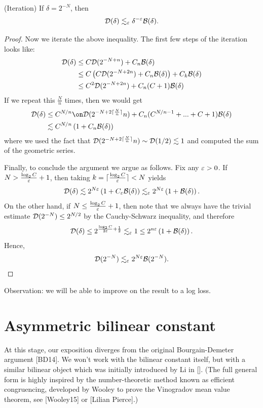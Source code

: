 \begin{cor}(Iteration) If $\delta=2^{-N}$, then
 \begin{align*}
    \mathcal{D}(\delta)\lesssim_\varepsilon \delta^{-\varepsilon}\mathcal{B}(\delta).
\end{align*} 
\end{cor}
\begin{proof}
Now we iterate the above inequality. The first few steps of the iteration looks like:
\begin{align*}
     \mathcal{D}(\delta)&\leq C\mathcal{D}(2^{-N+n})+C_n\mathcal{B}(\delta)\\
     &\leq C\left(C\mathcal{D}(2^{-N+2n}) + C_n\mathcal{B}(\delta)\right) + C_k\mathcal{B}(\delta)\\
     &\leq C^2\mathcal{D}(2^{-N+2n})+C_n(C+1)\mathcal{B}(\delta)
\end{align*}
If we repeat this $\frac{N}{n}$ times, then we would get
\begin{align*}
    \Dec(\delta)&\leq C^{N/n}\on\Dec(2^{-N+2\ceil{\frac{N}{n}}}n)+C_n(C^{N/n-1}+...+C+1)\BilinDec(\delta)\\
    &\lesssim C^{N/n}\left(1+C_n\BilinDec(\delta)\right)
\end{align*}
where we used the fact that $\mathcal{D}(2^{-N+2\lceil\frac{N}{n}\rceil}n)\sim \mathcal{D}(1/2) \lesssim1$ and computed the sum of the geometric series.


Finally, to conclude the argument we argue as follows. Fix any $\varepsilon>0$. If $N > \frac{\log_2C}{\varepsilon}+1$, then taking $k=\lceil\frac{\log_2C}{\varepsilon}\rceil<N$ yields
\begin{align*}
    \mathcal{D}(\delta)\lesssim 2^{N\varepsilon}\left(1+C_\varepsilon\mathcal{B}(\delta)\right)\lesssim_\varepsilon 2^{N\varepsilon}\left(1+\mathcal{B}(\delta)\right).
\end{align*}
On the other hand, if $N\leq\frac{\log_2C}{\varepsilon}+1$, then note that we always have the trivial estimate $\mathcal{D}(2^{-N})\leq 2^{N/2}$ by the Cauchy-Schwarz inequality, and therefore
\begin{align*}
    \mathcal{D}(\delta)\leq 2^{\frac{\log_2C}{2\varepsilon}+\frac{1}{2}}\lesssim_\varepsilon 1 \leq 2^{n\varepsilon}\left(1+\mathcal{B}(\delta)\right).
\end{align*}
Hence,
\begin{align*}
    \mathcal{D}(2^{-N})\lesssim_\varepsilon 2^{N\varepsilon}\mathcal{B}(2^{-N}).
\end{align*}
\end{proof}
Observation: we will be able to improve on the result to a log loss.
\newpage
\section{Asymmetric bilinear constant}
At this stage, our exposition diverges from the original Bourgain-Demeter argument [BD14]. We won't work with the bilinear constant itself, but with a similar bilinear object which was initially introduced by Li in []. 
(The full general form is highly inspired by the number-theoretic method known as efficient congruencing, developed by Wooley to prove the Vinogradov mean value theorem, see [Wooley15] or [Lilian Pierce].)

